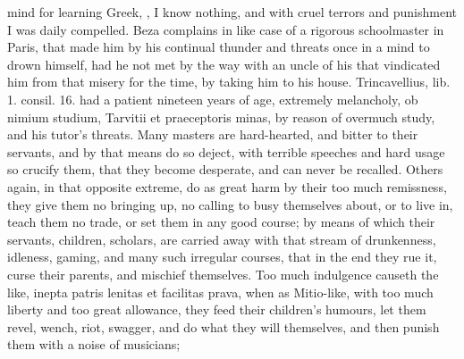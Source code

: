 {mind for learning Greek, , I know nothing, and with
cruel terrors and punishment I was daily compelled. Beza
complains in like case of a rigorous schoolmaster in Paris, that made
him by his continual thunder and threats once in a mind to drown
himself, had he not met by the way with an uncle of his that vindicated
him from that misery for the time, by taking him to his house.
Trincavellius, lib. 1. consil. 16. had a patient nineteen years of age,
extremely melancholy, ob nimium studium, Tarvitii et praeceptoris
minas, by reason of overmuch study, and his tutor's threats. Many
masters are hard-hearted, and bitter to their servants, and by that
means do so deject, with terrible speeches and hard usage so crucify
them, that they become desperate, and can never be recalled.
Others again, in that opposite extreme, do as great harm by their too
much remissness, they give them no bringing up, no calling to busy
themselves about, or to live in, teach them no trade, or set them in
any good course; by means of which their servants, children, scholars,
are carried away with that stream of drunkenness, idleness, gaming, and
many such irregular courses, that in the end they rue it, curse their
parents, and mischief themselves. Too much indulgence causeth the like,
inepta patris lenitas et facilitas prava, when as Mitio-like,
with too much liberty and too great allowance, they feed their
children's humours, let them revel, wench, riot, swagger, and do what
they will themselves, and then punish them with a noise of musicians;

}
